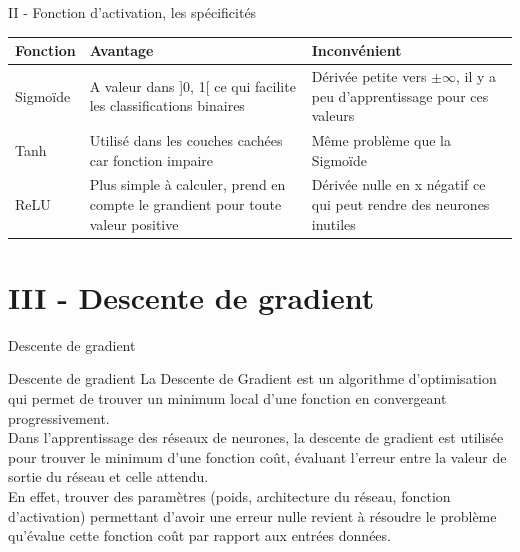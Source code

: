 \documentclass[10pt]{beamer}
\begin{document}
\begin{frame}{II - Fonction d'activation, les spécificités}


\begin{block}{}
\centering
\begin{tabular}{ |p{}||p{}|p{} | }
\hline 
   Fonction & Avantage & Inconvénient \\ [20pt] \hline \hline 
   Sigmoïde & A valeur dans ]0, 1[ ce qui facilite les classifications binaires & Dérivée petite vers $\pm\infty$, il y a peu d'apprentissage pour ces valeurs \\ [20pt] \hline
   Tanh & Utilisé dans les couches cachées car fonction impaire  & Même problème que la Sigmoïde \\ [20pt] \hline
   ReLU & Plus simple à calculer, prend en compte le grandient pour toute valeur positive & Dérivée nulle en x négatif ce qui peut rendre des neurones inutiles \\ [20pt] \hline 
\end{tabular}
\end{block}
\end{frame}


\section{III - Descente de gradient}
\begin{frame}{Descente de gradient}
\begin{block}{Descente de gradient}
La Descente de Gradient est un algorithme d’optimisation qui permet de trouver un minimum local d'une fonction en convergeant progressivement. \\
Dans l'apprentissage des réseaux de neurones, la descente de gradient est utilisée pour trouver le minimum d'une fonction coût, évaluant l'erreur entre la valeur de sortie du réseau et celle attendu. \\
En effet, trouver des paramètres (poids, architecture du réseau, fonction d'activation) permettant d'avoir une erreur nulle revient à résoudre le problème qu'évalue cette fonction coût par rapport aux entrées données.
\end{block}
\end{frame}
\end{document}
